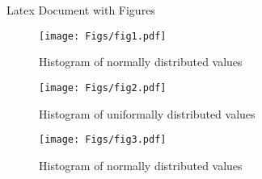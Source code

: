 \documentclass[12pt]{article}
\begin{document}
\huge{Latex Document with Figures}
\begin{figure}[!p]
\centering\texttt{[image: Figs/fig1.pdf]}
\caption{Histogram of normally distributed values}
\label{Fig1}
\end{figure}

\begin{figure}[!p]
    \centering\texttt{[image: Figs/fig2.pdf]}
    \caption{Histogram of uniformally distributed values}
    \label{Fig2}
    \end{figure}
    
    \begin{figure}[!p]
    \centering\texttt{[image: Figs/fig3.pdf]}
    \caption{Histogram of normally distributed values}
    \label{Fig3}
    \end{figure}
\end{document}
